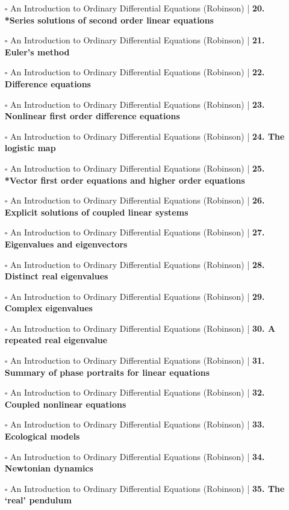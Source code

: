 \documentclass[a4, landscape, 12pt]{article}
\newcommand{\checkbox}{$\square$}%
\begin{document}
\begin{itemize}
{}
\item [\checkbox] An Introduction to Ordinary Differential Equations (Robinson)  | \textbf{20. *Series solutions of second order linear equations
}
\item [\checkbox] An Introduction to Ordinary Differential Equations (Robinson)  | \textbf{21. Euler's method
}
\item [\checkbox] An Introduction to Ordinary Differential Equations (Robinson)  | \textbf{22. Difference equations
}
\item [\checkbox] An Introduction to Ordinary Differential Equations (Robinson)  | \textbf{23. Nonlinear first order difference equations
}
\item [\checkbox] An Introduction to Ordinary Differential Equations (Robinson)  | \textbf{24. The logistic map
}
\item [\checkbox] An Introduction to Ordinary Differential Equations (Robinson)  | \textbf{25. *Vector first order equations and higher order equations
}
\item [\checkbox] An Introduction to Ordinary Differential Equations (Robinson)  | \textbf{26. Explicit solutions of coupled linear systems
}
\item [\checkbox] An Introduction to Ordinary Differential Equations (Robinson)  | \textbf{27. Eigenvalues and eigenvectors
}
\item [\checkbox] An Introduction to Ordinary Differential Equations (Robinson)  | \textbf{28. Distinct real eigenvalues
}
\item [\checkbox] An Introduction to Ordinary Differential Equations (Robinson)  | \textbf{29. Complex eigenvalues
}
\item [\checkbox] An Introduction to Ordinary Differential Equations (Robinson)  | \textbf{30. A repeated real eigenvalue
}
\item [\checkbox] An Introduction to Ordinary Differential Equations (Robinson)  | \textbf{31. Summary of phase portraits for linear equations
}
\item [\checkbox] An Introduction to Ordinary Differential Equations (Robinson)  | \textbf{32. Coupled nonlinear equations
}
\item [\checkbox] An Introduction to Ordinary Differential Equations (Robinson)  | \textbf{33. Ecological models
}
\item [\checkbox] An Introduction to Ordinary Differential Equations (Robinson)  | \textbf{34. Newtonian dynamics
}
\item [\checkbox] An Introduction to Ordinary Differential Equations (Robinson)  | \textbf{35. The ‘real’ pendulum
}
\end{itemize}
\end{document}
